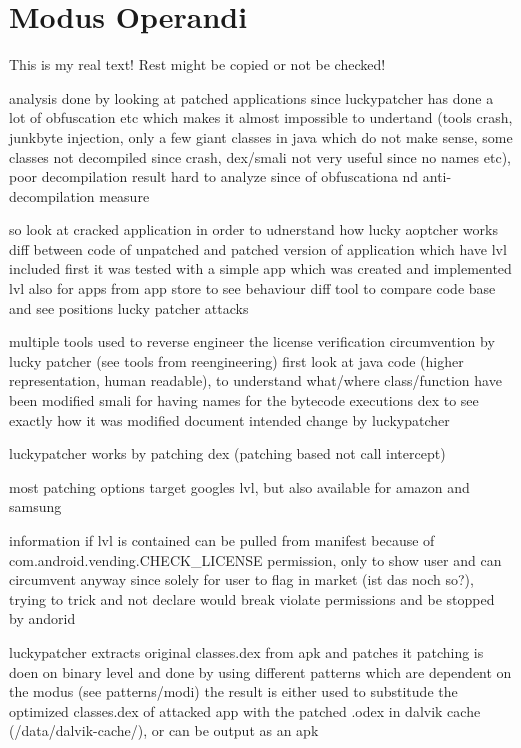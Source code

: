 \section{Modus Operandi}\label{section:luckypatcher-operation}
This is my real text! Rest might be copied or not be checked!

%
analysis done by looking at patched applications since luckypatcher has done a lot of obfuscation etc which makes it almost impossible to undertand (tools crash, junkbyte injection, only a few giant classes in java which do not make sense, some classes not decompiled since crash, dex/smali not very useful since no names etc), poor decompilation result
hard to analyze since of obfuscationa nd anti-decompilation measure

so look at cracked application in order to udnerstand how lucky aoptcher works
diff between code of unpatched and patched version of application which have lvl included
first it was tested with a simple app which was created and implemented lvl
also for apps from app store to see behaviour
diff tool to compare code base and see positions lucky patcher attacks

multiple tools used to reverse engineer the license verification circumvention by lucky patcher (see tools from reengineering)
first look at java code (higher representation, human readable), to understand what/where class/function have been modified
smali for having names for the bytecode executions
dex to see exactly how it was modified
document intended change by luckypatcher

luckypatcher works by patching dex (patching based not call intercept)

most patching options target googles lvl, but also available for amazon and samsung

information if lvl is contained can be pulled from manifest because of com.android.vending.CHECK\_LICENSE permission, only to show user and can circumvent anyway since solely for user to flag in market (ist das noch so?), trying to trick and not declare would break violate permissions and be stopped by andorid

luckypatcher extracts original classes.dex from apk and patches it
patching is doen on binary level and done by using different patterns which are dependent on the modus (see patterns/modi)
the result is either used to substitude the optimized classes.dex of attacked app with the patched .odex in dalvik cache (/data/dalvik-cache/), or can be output as an apk

